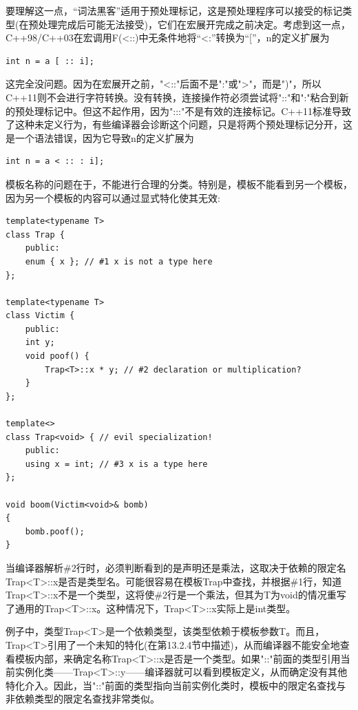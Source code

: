 要理解这一点，“词法黑客”适用于预处理标记，这是预处理程序可以接受的标记类型(在预处理完成后可能无法接受)，它们在宏展开完成之前决定。考虑到这一点，C++98/C++03在宏调用F(<::)中无条件地将“<:”转换为“[”，n的定义扩展为

\begin{lstlisting}[style=styleCXX]
int n = a [ :: i];
\end{lstlisting}

这完全没问题。因为在宏展开之前，"<::"后面不是":"或">"，而是")"，所以C++11则不会进行字符转换。没有转换，连接操作符必须尝试将"::"和":"粘合到新的预处理标记中。但这不起作用，因为":::"不是有效的连接标记。C++11标准导致了这种未定义行为，有些编译器会诊断这个问题，只是将两个预处理标记分开，这是一个语法错误，因为它导致n的定义扩展为

\begin{lstlisting}[style=styleCXX]
int n = a < :: : i];
\end{lstlisting}


模板名称的问题在于，不能进行合理的分类。特别是，模板不能看到另一个模板，因为另一个模板的内容可以通过显式特化使其无效:

\begin{lstlisting}[style=styleCXX]
template<typename T>
class Trap {
	public:
	enum { x }; // #1 x is not a type here
};

template<typename T>
class Victim {
	public:
	int y;
	void poof() {
		Trap<T>::x * y; // #2 declaration or multiplication?
	}
};

template<>
class Trap<void> { // evil specialization!
	public:
	using x = int; // #3 x is a type here
};

void boom(Victim<void>& bomb)
{
	bomb.poof();
}
\end{lstlisting}

当编译器解析\#2行时，必须判断看到的是声明还是乘法，这取决于依赖的限定名Trap<T>::x是否是类型名。可能很容易在模板Trap中查找，并根据\#1行，知道Trap<T>::x不是一个类型，这将使\#2行是一个乘法，但其为T为void的情况重写了通用的Trap<T>::x。这种情况下，Trap<T>::x实际上是int类型。

例子中，类型Trap<T>是一个依赖类型，该类型依赖于模板参数T。而且，Trap<T>引用了一个未知的特化(在第13.2.4节中描述)，从而编译器不能安全地查看模板内部，来确定名称Trap<T>::x是否是一个类型。如果"::"前面的类型引用当前实例化类——Trap<T>::y——编译器就可以看到模板定义，从而确定没有其他特化介入。因此，当"::"前面的类型指向当前实例化类时，模板中的限定名查找与非依赖类型的限定名查找非常类似。

